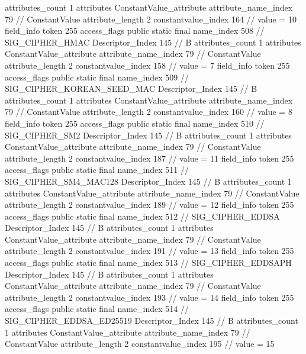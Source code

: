 {{{{{				attributes_count	1
				attributes {
				ConstantValue_attribute {
					attribute_name_index	79		// ConstantValue
					attribute_length	2
					constantvalue_index	164		// value = 10
				}
				}
			}
			field_info {
				token	255
				access_flags	public static final
				name_index	508		// SIG_CIPHER_HMAC
				Descriptor_Index	145		// B
				attributes_count	1
				attributes {
				ConstantValue_attribute {
					attribute_name_index	79		// ConstantValue
					attribute_length	2
					constantvalue_index	158		// value = 7
				}
				}
			}
			field_info {
				token	255
				access_flags	public static final
				name_index	509		// SIG_CIPHER_KOREAN_SEED_MAC
				Descriptor_Index	145		// B
				attributes_count	1
				attributes {
				ConstantValue_attribute {
					attribute_name_index	79		// ConstantValue
					attribute_length	2
					constantvalue_index	160		// value = 8
				}
				}
			}
			field_info {
				token	255
				access_flags	public static final
				name_index	510		// SIG_CIPHER_SM2
				Descriptor_Index	145		// B
				attributes_count	1
				attributes {
				ConstantValue_attribute {
					attribute_name_index	79		// ConstantValue
					attribute_length	2
					constantvalue_index	187		// value = 11
				}
				}
			}
			field_info {
				token	255
				access_flags	public static final
				name_index	511		// SIG_CIPHER_SM4_MAC128
				Descriptor_Index	145		// B
				attributes_count	1
				attributes {
				ConstantValue_attribute {
					attribute_name_index	79		// ConstantValue
					attribute_length	2
					constantvalue_index	189		// value = 12
				}
				}
			}
			field_info {
				token	255
				access_flags	public static final
				name_index	512		// SIG_CIPHER_EDDSA
				Descriptor_Index	145		// B
				attributes_count	1
				attributes {
				ConstantValue_attribute {
					attribute_name_index	79		// ConstantValue
					attribute_length	2
					constantvalue_index	191		// value = 13
				}
				}
			}
			field_info {
				token	255
				access_flags	public static final
				name_index	513		// SIG_CIPHER_EDDSAPH
				Descriptor_Index	145		// B
				attributes_count	1
				attributes {
				ConstantValue_attribute {
					attribute_name_index	79		// ConstantValue
					attribute_length	2
					constantvalue_index	193		// value = 14
				}
				}
			}
			field_info {
				token	255
				access_flags	public static final
				name_index	514		// SIG_CIPHER_EDDSA_ED25519
				Descriptor_Index	145		// B
				attributes_count	1
				attributes {
				ConstantValue_attribute {
					attribute_name_index	79		// ConstantValue
					attribute_length	2
					constantvalue_index	195		// value = 15
				}
				}
			}
}}}}

